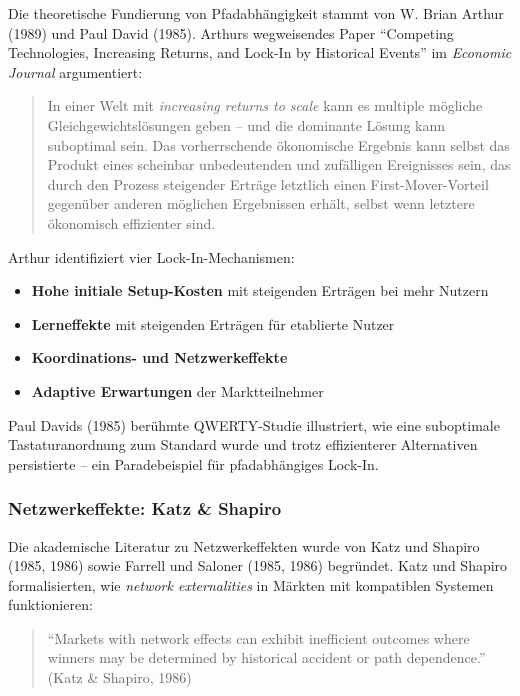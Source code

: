 Die theoretische Fundierung von Pfadabhängigkeit stammt von W. Brian Arthur (1989) und Paul David (1985). Arthurs wegweisendes Paper ``Competing Technologies, Increasing Returns, and Lock-In by Historical Events'' im \textit{Economic Journal} argumentiert:

\begin{quote}
In einer Welt mit \textit{increasing returns to scale} kann es multiple mögliche Gleichgewichtslösungen geben -- und die dominante Lösung kann suboptimal sein. Das vorherrschende ökonomische Ergebnis kann selbst das Produkt eines scheinbar unbedeutenden und zufälligen Ereignisses sein, das durch den Prozess steigender Erträge letztlich einen First-Mover-Vorteil gegenüber anderen möglichen Ergebnissen erhält, selbst wenn letztere ökonomisch effizienter sind.
\end{quote}

Arthur identifiziert vier Lock-In-Mechanismen:
\begin{itemize}
    \item \textbf{Hohe initiale Setup-Kosten} mit steigenden Erträgen bei mehr Nutzern
    \item \textbf{Lerneffekte} mit steigenden Erträgen für etablierte Nutzer
    \item \textbf{Koordinations- und Netzwerkeffekte}
    \item \textbf{Adaptive Erwartungen} der Marktteilnehmer
\end{itemize}

Paul Davids (1985) berühmte QWERTY-Studie illustriert, wie eine suboptimale Tastaturanordnung zum Standard wurde und trotz effizienterer Alternativen persistierte -- ein Paradebeispiel für pfadabhängiges Lock-In.

\subsubsection{Netzwerkeffekte: Katz \& Shapiro}

Die akademische Literatur zu Netzwerkeffekten wurde von Katz und Shapiro (1985, 1986) sowie Farrell und Saloner (1985, 1986) begründet. Katz und Shapiro formalisierten, wie \textit{network externalities} in Märkten mit kompatiblen Systemen funktionieren:

\begin{quote}
``Markets with network effects can exhibit inefficient outcomes where winners may be determined by historical accident or path dependence.'' (Katz \& Shapiro, 1986)
\end{quote}

